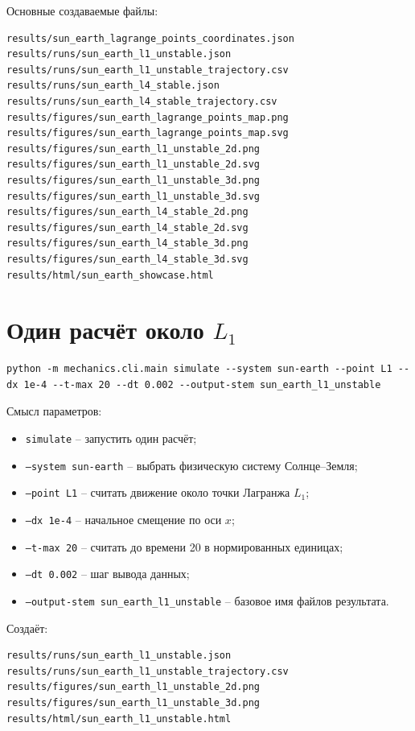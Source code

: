 \documentclass[a4paper,12pt]{article}
\begin{document}
Основные создаваемые файлы:

\begin{lstlisting}
results/sun_earth_lagrange_points_coordinates.json
results/runs/sun_earth_l1_unstable.json
results/runs/sun_earth_l1_unstable_trajectory.csv
results/runs/sun_earth_l4_stable.json
results/runs/sun_earth_l4_stable_trajectory.csv
results/figures/sun_earth_lagrange_points_map.png
results/figures/sun_earth_lagrange_points_map.svg
results/figures/sun_earth_l1_unstable_2d.png
results/figures/sun_earth_l1_unstable_2d.svg
results/figures/sun_earth_l1_unstable_3d.png
results/figures/sun_earth_l1_unstable_3d.svg
results/figures/sun_earth_l4_stable_2d.png
results/figures/sun_earth_l4_stable_2d.svg
results/figures/sun_earth_l4_stable_3d.png
results/figures/sun_earth_l4_stable_3d.svg
results/html/sun_earth_showcase.html
\end{lstlisting}

\section{Один расчёт около $L_1$}

\begin{lstlisting}
python -m mechanics.cli.main simulate --system sun-earth --point L1 --dx 1e-4 --t-max 20 --dt 0.002 --output-stem sun_earth_l1_unstable
\end{lstlisting}

Смысл параметров:

\begin{itemize}[leftmargin=1.2cm]
  \item \texttt{simulate} -- запустить один расчёт;
  \item \texttt{--system sun-earth} -- выбрать физическую систему Солнце--Земля;
  \item \texttt{--point L1} -- считать движение около точки Лагранжа $L_1$;
  \item \texttt{--dx 1e-4} -- начальное смещение по оси $x$;
  \item \texttt{--t-max 20} -- считать до времени 20 в нормированных единицах;
  \item \texttt{--dt 0.002} -- шаг вывода данных;
  \item \texttt{--output-stem sun\_earth\_l1\_unstable} -- базовое имя файлов результата.
\end{itemize}

Создаёт:

\begin{lstlisting}
results/runs/sun_earth_l1_unstable.json
results/runs/sun_earth_l1_unstable_trajectory.csv
results/figures/sun_earth_l1_unstable_2d.png
results/figures/sun_earth_l1_unstable_3d.png
results/html/sun_earth_l1_unstable.html
\end{lstlisting}
\end{document}
